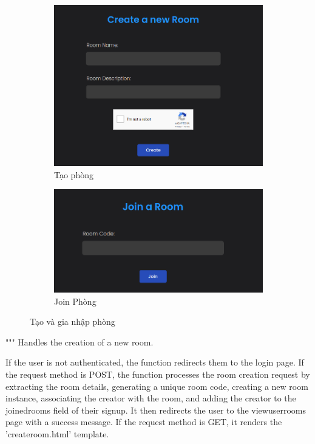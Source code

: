 \documentclass[paper=a4wide, fontsize=12pt]{scrartcl}	 %
\begin{document}
\begin{figure}[H]
    \centering
    \begin{subfigure}{.5\textwidth}
      \centering
      \includegraphics[scale=0.4]{demo/create_room.png}
      \caption{Tạo phòng}
      \label{fig:sub1}
    \end{subfigure}%
    \begin{subfigure}{.5\textwidth}
      \centering
      \includegraphics[scale=0.4]{demo/join_room.png}
      \caption{Join Phòng}
      \label{fig:sub2}
    \end{subfigure}
    \caption{Tạo và gia nhập phòng}
    \label{fig:test}
\end{figure}

"""
Handles the creation of a new room.

If the user is not authenticated, the function redirects them to the login page.
If the request method is POST, the function processes the room creation request by extracting the room details,
generating a unique room code, creating a new room instance, associating the creator with the room, and adding the
creator to the joinedrooms field of their signup. It then redirects the user to the viewuserrooms page with a success message.
If the request method is GET, it renders the 'createroom.html' template.
\end{document}
